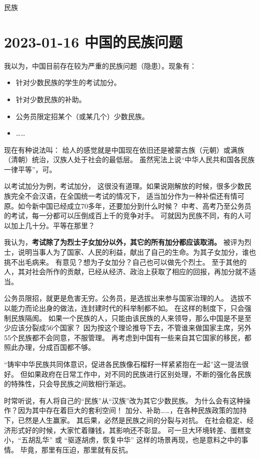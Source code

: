 \begin{taged}{民族}
\section{2023-01-16 中国的民族问题}
\end{taged}

我以为，中国目前存在较为严重的民族问题（隐患）。现象有：

\begin{itemize}[nosep, left=\parindent]
    \item 针对少数民族的学生的考试加分。
    \item 针对少数民族的补助。
    \item 公务员限定招某个（或某几个）少数民族。
    \item ……
\end{itemize}

现在有种说法叫：
给人的感觉就是中国现在依旧还是被蒙古族（元朝）或满族（清朝）统治，汉族人处于社会的最低层。
虽然宪法上说“中华人民共和国各民族一律平等”，可。

以考试加分为例，考试加分，
这很没有道理。如果说刚解放的时候，很多少数民族完全不会汉语，在全国统一考试的情况下，
适当加分作为一种补偿还有情可原。如今新中国已经成立70多年，还要加分到什么时候？
中考、高考乃至公务员的考试，每一分都可以压倒成百上千的竞争对手。
可就因为民族不同，有的人可以加上几十分。平等在那里？

我认为，\textbf{考试除了为烈士子女加分以外，其它的所有加分都应该取消。}
被评为烈士，说明当事人为了国家、人民的利益，献出了自己的生命。为其子女加分，谁也挑不出毛病来。
有意见？想为子女加分？自己也可以做先个烈士。
至于其他的人，其对社会所作的贡献，已经从经济、政治上获取了相应的回报，再加分就不适当。

公务员限招，就更是危害无穷。公务员，是选拔出来参与国家治理的人。
选拔不以能力而论出身的做法，连封建时代的科举制都不如。
在这样的制度下，只会强制民族隔阂。
如果一个民族的人，只能由该民族的人来领导，那么中国是不是至少应该分裂成56个国家？
因为按这个理论推导下去，不管谁来做国家主席，另外55个民族都不会同意，不服管理。
再考虑到中国有一些来自其它国家的移民，都照此办理，分成百国都不够。

“铸牢中华民族共同体意识，促进各民族像石榴籽一样紧紧抱在一起”这一提法很好。
但如果政府在日常工作中，对不同的民族进行区别处理，不断的强化各民族的特殊性，只会导民族之间致相行渐远。

时常听说，有人将自己的“民族”从“汉族”改为其它少数民族。
为什么会有这种操作？因为其中存在着巨大的套利空间！
加分、补助……，在各种民族政策的加持下，已然是人生赢家。
其后果，必然是民族之间的分裂与对抗。
在社会稳定、经济形式好的时候，大家忙着赚钱，其影响还不彰显。
可一旦大环境转差、蛋糕变小，“五胡乱华” 或 “驱逐胡虏，恢复中华” 这样的场景再现，也是意料之中的事情。
毕竟，那里有压迫，那里就有反抗。

